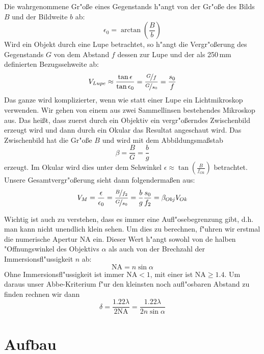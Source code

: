 \documentclass[11pt,a4paper]{article}
\begin{document}
Die wahrgenommene Gr"o\ss e eines Gegenstands h"angt von der Gr"o\ss e des Bilds $B$ und der Bildweite $b$ ab:
\begin{equation}
\epsilon_0=\arctan\left(\frac{B}{b}\right)\label{eq:1}
\end{equation}
Wird ein Objekt durch eine Lupe betrachtet, so h"angt die Vergr"o\ss erung des Gegenstands $G$ von dem Abstand $f$ dessen zur Lupe und der als 250\,mm definierten Bezugssehweite ab:
\begin{equation}
V_{Lupe}\approx\frac{\tan\epsilon}{\tan\epsilon_0}=\frac{\nicefrac{G}{f}}{\nicefrac{G}{s_0}}=\frac{s_0}{f}\label{eq:3}
\end{equation}
Das ganze wird komplizierter, wenn wie statt einer Lupe ein Lichtmikroskop verwenden. Wir gehen von einem aus zwei Sammellinsen bestehendes Mikroskop aus. Das hei\ss t, dass zuerst durch ein Objektiv ein vergr"o\ss erndes Zwischenbild erzeugt wird und dann durch ein Okular das Resultat angeschaut wird. Das Zwischenbild hat die Gr"o\ss e $B$ und wird mit dem Abbildungsma\ss stab
\begin{equation}
\beta=\frac{B}{G}=\frac{b}{g}\label{eq:4}
\end{equation}
erzeugt. Im Okular wird dies unter dem Sehwinkel $\epsilon\approx\tan\left(\frac{B}{f_{Ok}}\right)$ betrachtet. Unsere Gesamtvergr"o\ss erung sieht dann folgenderma\ss en aus:
\begin{equation}
V_M=\frac{\epsilon}{\epsilon_0}=\frac{\nicefrac{B}{f_2}}{\nicefrac{G}{s_0}}=\frac{b}{g}\frac{s_0}{f_2}=\beta_{Obj}V_{Ok}\label{eq:5}
\end{equation}

Wichtig ist auch zu verstehen, dass es immer eine Aufl"osebegrenzung gibt, d.h. man kann nicht unendlich klein sehen. Um dies zu berechnen, f"uhren wir erstmal die numerische Apertur NA ein. Dieser Wert h"angt sowohl von de halben "Offnungswinkel des Objektivs $\alpha$ als auch von der Brechzahl der Immersionsfl"ussigkeit $n$ ab:
\begin{equation}
\mathrm{NA}=n\sin\alpha\label{eq:7}
\end{equation}
Ohne Immersionsfl"ussigkeit ist immer NA$<1$, mit einer ist NA$\geq1.4$.
Um daraus unser Abbe-Kriterium f"ur den kleinsten noch aufl"osbaren Abstand zu finden rechnen wir dann
\begin{equation}
\delta=\frac{1.22\lambda}{2\mathrm{NA}}=\frac{1.22\lambda}{2n\sin\alpha}\label{eq:8}
\end{equation}

\section{Aufbau}
\end{document}
